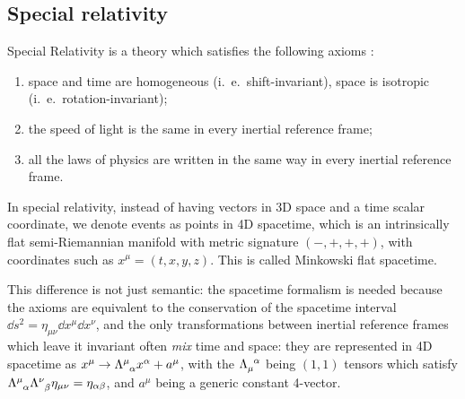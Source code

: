 \documentclass[main.tex]{subfiles}
\begin{document}
%
%
%
%
%

\subsection{Special relativity}

Special Relativity is a theory which satisfies the following axioms \cite[]{Lechner:2014}:

\begin{enumerate}
    \item space and time are homogeneous (i.\ e.\ shift-invariant), space is isotropic (i.\ e.\ rotation-invariant);
    \item the speed of light is the same in every inertial reference frame;
    \item all the laws of physics are written in the same way in every inertial reference frame.
\end{enumerate}

In special relativity, instead of having vectors in 3D space and a time scalar coordinate, we denote events as points in 4D spacetime, which is an intrinsically flat semi-Riemannian manifold with metric signature \((-, +, +, +)\), with coordinates such as \(x^\mu = (t, x, y, z)\).
This is called Minkowski flat spacetime.

This difference is not just semantic: the spacetime formalism is needed because the axioms are equivalent to the conservation of the spacetime interval \(\dd{s}^2 = \eta_{\mu\nu} \dd{x}^\mu\dd{x}^\nu\), and the only transformations between inertial reference frames which leave it invariant often \emph{mix} time and space:
they are  represented in 4D spacetime as \(x^\mu \rightarrow \Lambda\indices{^\mu_\alpha} x^\alpha + a^\mu\), with the \(\Lambda\indices{_\mu^\alpha}\) being \((1,1)\) tensors which satisfy \(\Lambda\indices{^\mu_\alpha} \Lambda\indices{^\nu_\beta} \eta_{\mu\nu} = \eta_{\alpha \beta}\), and \(a^\mu\) being a generic constant 4-vector.
\end{document}
